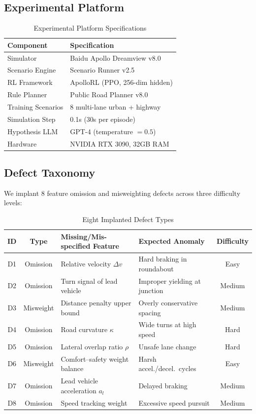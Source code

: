 \documentclass[journal]{IEEEtran}
\theoremstyle{plain}
\theoremstyle{definition}
\theoremstyle{remark}
\begin{document}
\subsection{Experimental Platform}

\begin{table}[t]
\centering
\caption{Experimental Platform Specifications}
\label{tab:platform}
\small
\begin{tabular}{ll}
\toprule
\textbf{Component} & \textbf{Specification} \\\midrule
Simulator & Baidu Apollo Dreamview v8.0 \\
Scenario Engine & Scenario Runner v2.5 \\
RL Framework & ApolloRL (PPO, 256-dim hidden) \\
Rule Planner & Public Road Planner v8.0 \\
Training Scenarios & 8 multi-lane urban + highway \\
Simulation Step & 0.1s (30s per episode) \\
Hypothesis LLM & GPT-4 (temperature $=0.5$) \\
Hardware & NVIDIA RTX 3090, 32GB RAM \\
\bottomrule
\end{tabular}
\end{table}

\subsection{Defect Taxonomy}

We implant 8 feature omission and misweighting defects across three difficulty levels:

\begin{table}[t]
\centering
\caption{Eight Implanted Defect Types}
\label{tab:defects}
\small
\begin{tabular}{ccp{2.5cm}p{2.2cm}c}
\toprule
\textbf{ID} & \textbf{Type} & \textbf{Missing/Mis-specified Feature} & \textbf{Expected Anomaly} & \textbf{Difficulty}\\\midrule
D1 & Omission & Relative velocity $\Delta v$ & Hard braking in roundabout & Easy\\
D2 & Omission & Turn signal of lead vehicle & Improper yielding at junction & Medium\\
D3 & Misweight & Distance penalty upper bound & Overly conservative spacing & Medium\\
D4 & Omission & Road curvature $\kappa$ & Wide turns at high speed & Hard\\
D5 & Omission & Lateral overlap ratio $\rho$ & Unsafe lane change & Hard\\
D6 & Misweight & Comfort--safety weight balance & Harsh accel./decel.\ cycles & Easy\\
D7 & Omission & Lead vehicle acceleration $a_l$ & Delayed braking & Medium\\
D8 & Omission & Speed tracking weight & Excessive speed pursuit & Medium\\
\bottomrule
\end{tabular}
\end{table}
\end{document}
